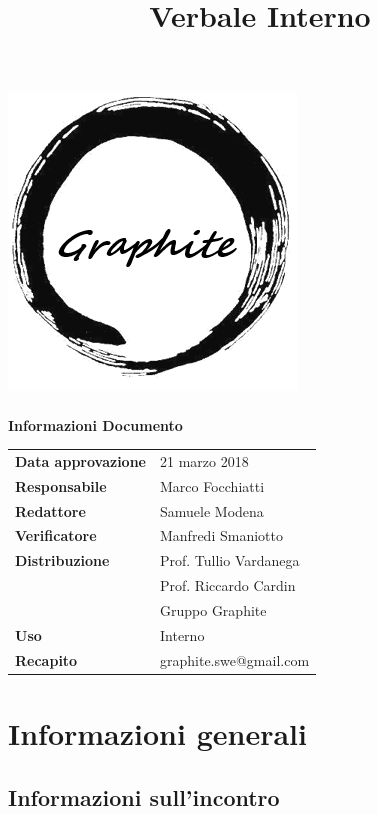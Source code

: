 \documentclass[openany,12pt,a4paper]{article}
\title{Verbale Interno}
\author{}
\begin{document}
	\makeatletter
	\begin{titlepage}
		\setlength{\headsep}{0pt}  
		\begin{center}
			\includegraphics[width=0.5\linewidth]{Logo.png}\\[1em]
			{\huge \bfseries  \@title }\\[10ex]
			\textbf{\Large Informazioni Documento} \\[2em]
			\bgroup
			\def\arraystretch{1.5}
			\begin{tabular}{l|l}
				\textbf{Data approvazione} & 21 marzo 2018 \\
				\textbf{Responsabile} & Marco Focchiatti \\
				\textbf{Redattore} & Samuele Modena \\
				\textbf{Verificatore} & Manfredi Smaniotto \\
				\textbf{Distribuzione} & Prof. Tullio Vardanega \\
				 & Prof. Riccardo Cardin \\
				 & Gruppo Graphite \\
				\textbf{Uso} & Interno \\
				\textbf{Recapito} & graphite.swe@gmail.com \\
			\end{tabular}
		\egroup
		\end{center}
	\end{titlepage}
	\makeatother

	\thispagestyle{empty}
	\newpage
	
	\tableofcontents
	\newpage
	
	\section{Informazioni generali}
	
	\subsection{Informazioni sull'incontro}
	
\end{document}
